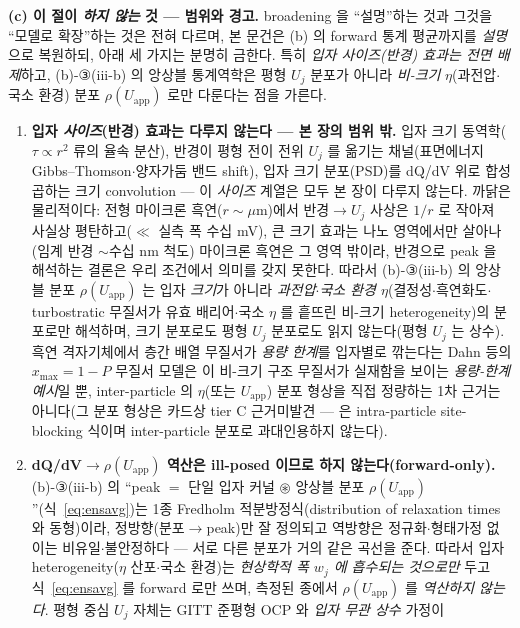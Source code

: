 \documentclass[11pt,a4paper]{article}
\newcommand{\app}{\mathrm{app}}
\begin{document}
\textbf{(c) 이 절이 \emph{하지 않는} 것 — 범위와 경고.} broadening 을 ``설명''하는 것과 그것을 ``모델로 확장''하는 것은
전혀 다르며, 본 문건은 (b) 의 forward 통계 평균까지를 \emph{설명}으로 복원하되, 아래 세 가지는 분명히 금한다. 특히
\emph{입자 사이즈(반경) 효과는 전면 배제}하고, (b)-③(iii-b) 의 앙상블 통계역학은 평형 $U_j$ 분포가 아니라 \emph{비-크기}
$\eta$(과전압$\cdot$국소 환경) 분포 $\rho(U_\app)$ 로만 다룬다는 점을 가른다.
\begin{enumerate}[label=(\roman*),leftmargin=2.2em,itemsep=2.5pt]
\item \textbf{입자 \emph{사이즈}(반경) 효과는 다루지 않는다 — 본 장의 범위 밖.} 입자 크기 동역학($\tau\!\propto\!r^2$
류의 율속 분산), 반경이 평형 전이 전위 $U_j$ 를 옮기는 채널(표면에너지 Gibbs--Thomson$\cdot$양자가둠 밴드 shift), 입자
크기 분포(PSD)를 dQ/dV 위로 합성곱하는 크기 convolution — 이 \emph{사이즈} 계열은 모두 본 장이 다루지 않는다. 까닭은
물리적이다: 전형 마이크론 흑연($r\!\sim\!\mu$m)에서 반경$\to U_j$ 사상은 $1/r$ 로 작아져 사실상 평탄하고($\ll$ 실측 폭
수십 mV), 큰 크기 효과는 나노 영역에서만 살아나(임계 반경 $\sim$수십 nm 척도) 마이크론 흑연은 그 영역 밖이라, 반경으로
peak 을 해석하는 결론은 우리 조건에서 의미를 갖지 못한다. 따라서 (b)-③(iii-b) 의 앙상블 분포 $\rho(U_\app)$ 는 입자
\emph{크기}가 아니라 \emph{과전압$\cdot$국소 환경 $\eta$}(결정성$\cdot$흑연화도$\cdot$turbostratic 무질서가 유효
배리어$\cdot$국소 $\eta$ 를 흩뜨린 비-크기 heterogeneity)의 분포로만 해석하며, 크기 분포로도 평형 $U_j$ 분포로도 읽지
않는다(평형 $U_j$ 는 상수). 흑연 격자기체에서 층간 배열 무질서가 \emph{용량 한계}를 입자별로 깎는다는 Dahn 등의
$x_{\max}=1-P$ 무질서 모델\cite{dahn1995}은 이 비-크기 구조 무질서가 실재함을 보이는 \emph{용량-한계 예시}일 뿐,
inter-particle 의 $\eta$(또는 $U_\app$) 분포 형상을 직접 정량하는 1차 근거는 아니다(그 분포 형상은 카드상 tier C
근거미발견 — \cite{dahn1995} 은 intra-particle site-blocking 식이며 inter-particle 분포로 과대인용하지 않는다).
\item \textbf{dQ/dV$\to\rho(U_\app)$ 역산은 ill-posed 이므로 하지 않는다(forward-only).} (b)-③(iii-b) 의 ``peak $=$
단일 입자 커널 $\circledast$ 앙상블 분포 $\rho(U_\app)$''(식~\eqref{eq:ensavg})는 1종 Fredholm 적분방정식(distribution
of relaxation times 와 동형)이라, 정방향(분포$\to$peak)만 잘 정의되고 역방향은 정규화$\cdot$형태가정 없이는
비유일$\cdot$불안정하다 — 서로 다른 분포가 거의 같은 곡선을 준다. 따라서 입자 heterogeneity($\eta$ 산포$\cdot$국소 환경)는
\emph{현상학적 폭 $w_j$ 에 흡수되는 것으로만} 두고 식~\eqref{eq:ensavg} 를 forward 로만 쓰며, 측정된 종에서
$\rho(U_\app)$ 를 \emph{역산하지 않는다}. 평형 중심 $U_j$ 자체는 GITT 준평형 OCP 와 \emph{입자 무관 상수} 가정이

\end{enumerate}
\end{document}
